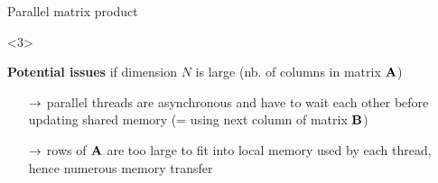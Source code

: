\documentclass[12pt,aspectratio=1610]{beamer}
\begin{document}
\begin{frame}{Parallel matrix product}
\begin{onlyenv}<3>

\textbf{Potential issues} if dimension $N$ is large {\small (nb. of columns in matrix $\mathbf{A}$)}

\begin{itemize}
\setitsep{1em}
\item[$\rightarrow$] parallel threads are asynchronous and have to wait each other before updating shared memory (= using next column of matrix $\mathbf{B}$)
\item[$\rightarrow$] rows of $\mathbf{A}$ are too large to fit into local memory used by each thread, hence numerous memory transfer
\end{itemize}

\end{onlyenv}
\end{frame}
\end{document}
